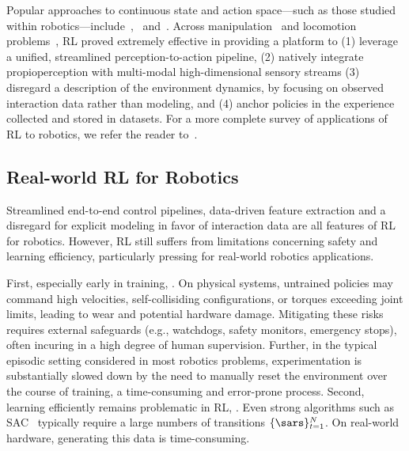 Popular approaches to continuous state and action space---such as those studied within robotics---include~\citet[TRPO]{schulmanTrustRegionPolicy2017},~\citet[PPO]{ schulmanProximalPolicyOptimization2017} and~\citet[SAC]{ haarnojaSoftActorCriticOffPolicy2018}.
Across manipulation~\citep{akkayaSolvingRubiksCube2019} and locomotion problems~\citep{leeLearningQuadrupedalLocomotion2020}, RL proved extremely effective in providing a platform to (1) leverage a unified, streamlined perception-to-action pipeline, (2) natively integrate propioperception with multi-modal high-dimensional sensory streams  (3) disregard a description of the environment dynamics, by focusing on observed interaction data rather than modeling, and (4) anchor policies in the experience collected and stored in datasets.
For a more complete survey of applications of RL to robotics, we refer the reader to~\citet{koberReinforcementLearningRobotics,tangDeepReinforcementLearning2024}.

\subsection{Real-world RL for Robotics}
Streamlined end-to-end control pipelines, data-driven feature extraction and a disregard for explicit modeling in favor of interaction data are all features of RL for robotics.
However, RL still suffers from limitations concerning safety and learning efficiency, particularly pressing for real-world robotics applications.

First, especially early in training, .
On physical systems, untrained policies may command high velocities, self-collisiding configurations, or torques exceeding joint limits, leading to wear and potential hardware damage.
Mitigating these risks requires external safeguards (e.g., watchdogs, safety monitors, emergency stops), often incuring in a high degree of human supervision.
Further, in the typical episodic setting considered in most robotics problems, experimentation is substantially slowed down by the need to manually reset the environment over the course of training, a time-consuming and error-prone process.
Second, learning efficiently remains problematic in RL, .
Even strong algorithms such as SAC~\citep{haarnojaSoftActorCriticOffPolicy2018} typically require a large numbers of transitions \( \{ \sars \}_{t=1}^N \).
On real-world hardware, generating this data is time-consuming.

